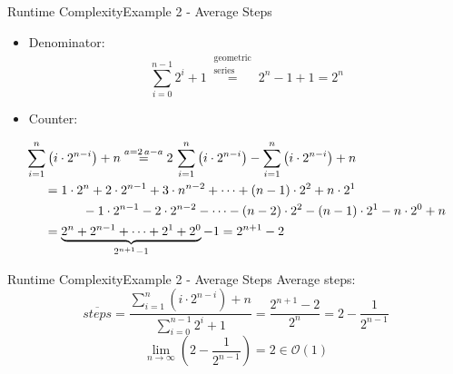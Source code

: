 \begin{frame}{Runtime Complexity}{Example 2 - Average Steps}
  \begin{itemize}
    \item
      Denominator:
      \begin{displaymath}
        \sum_{i=0}^{n-1} 2^i + 1
        \stackrel{\begin{array}{c}
          \text{geometric}\\
          \text{series}
        \end{array}}{=}
        2^n - 1 + 1 = 2^n
      \end{displaymath}
    \item
      Counter:
  \end{itemize}
  \begin{alignat*}{4}
    & \sum_{i=1}^n \left(i \cdot 2^{n-i}\right) + n
      \stackrel{a = 2\,a - a}{=}
        2 \, \sum_{i=1}^n \left(i \cdot 2^{n-i}\right)
        - \sum_{i=1}^n \left(i \cdot 2^{n-i}\right) + n\\
    & \hspace*{1.5em} = 1 \cdot 2^n + 2 \cdot 2^{n-1} + 3 \cdot n^{n-2} + \dots
        + (n-1) \cdot 2^2 + n \cdot 2^1\\
    & \hspace{4.5em}- 1 \cdot 2^{n-1} - 2 \cdot 2^{n-2} - \dots
        - (n-2) \cdot 2^2 - (n-1) \cdot 2^1 - n \cdot 2^0 + n\\
    & \hspace*{1.5em} = \underbrace{2^n + 2^{n-1} + \dots
        +2^1 + 2^0}_{2^{n+1}-1} - 1
      = 2^{n+1} - 2
  \end{alignat*}
\end{frame}


\begin{frame}{Runtime Complexity}{Example 2 - Average Steps}
  {\color{Mittel-Blau}Average steps}:
  \begin{displaymath}
    \overline{steps}
    = \frac{
      \sum\limits_{i=1}^n \left(i \cdot 2^{n-i}\right) + n
    }{\sum\limits_{i=0}^{n-1} 2^i + 1}
    = \frac{2^{n+1} - 2}{2^n}
    = 2 - \frac{1}{2^{n-1}}
  \end{displaymath}
  \begin{displaymath}
    \lim_{n \to \infty} \left(2 - \frac{1}{2^{n-1}}\right) = 2
    \in \mathcal{O}(1)
  \end{displaymath}
\end{frame}

